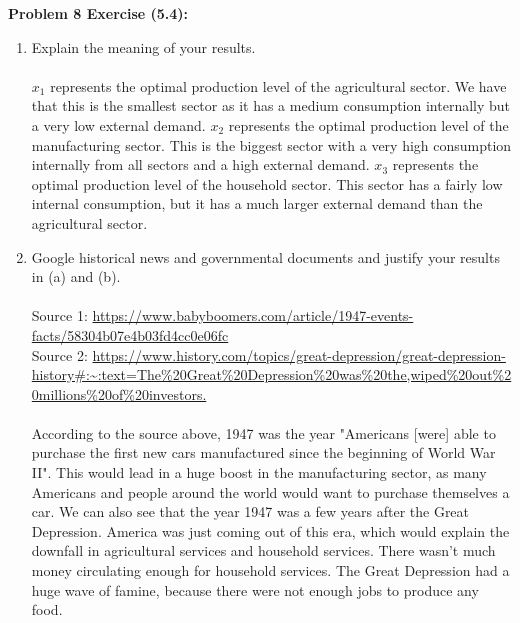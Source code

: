 \documentclass[11pt]{article}
\newenvironment{problem}[1]{\textbf{Problem #1: }}{\newpage}
\begin{document}
\begin{problem}{8 Exercise (5.4)}
\begin{enumerate}[label = (\alph*)]
			\newpage
			\item Explain the meaning of your results. 
			\\ \\
			$x_1$ represents the optimal production level of the agricultural sector.  We have that this is the smallest sector as it has a medium consumption internally but a very low external demand.  $x_2$ represents the optimal production level of the manufacturing sector. This is the biggest sector with a very high consumption internally from all sectors and a high external demand. $x_3$ represents the optimal production level of the household sector.  This sector has a fairly low internal consumption, but it has a much larger external demand than the agricultural sector.
			\\ 
			\item Google historical news and governmental documents and justify your results in (a)	and (b).
			\\ \\
			Source 1: \url{https://www.babyboomers.com/article/1947-events-facts/58304b07e4b03fd4cc0e06fc} \\
			Source 2: \url{https://www.history.com/topics/great-depression/great-depression-history#:~:text=The\%20Great\%20Depression\%20was\%20the,wiped\%20out\%20millions\%20of\%20investors.}
			\\ \\
			According to the source above, 1947 was the year "Americans [were] able to purchase the first new cars manufactured since the beginning of World War II".  This would lead in a huge boost in the manufacturing sector, as many Americans and people around the world would want to purchase themselves a car.  We can also see that the year 1947 was a few years after the Great Depression.  America was just coming out of this era, which would explain the downfall in agricultural services and household services.  There wasn't much money circulating enough for household services.  The Great Depression had a huge wave of famine, because there were not enough jobs to produce any food.
		\end{enumerate}
	\end{problem}
\end{document}
